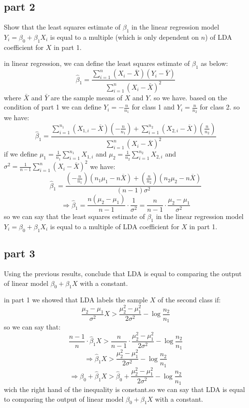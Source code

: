 \subsection{part 2}
Show that the least squares estimate of $\beta_1$ in the linear regression model $Y_i = \beta_0 + \beta_1 X_i$ is equal to a multiple (which is only dependent on $n$) of LDA coefficient for $X$ in part 1.

\begin{qsolve}
	\begin{qsolve}[]
		in linear regression, we can define the least squares estimate of $\beta_1$ as below:
		$$
		\hat{\beta}_1 = \frac{\sum_{i=1}^{n} (X_i - \bar{X})(Y_i - \bar{Y})}{\sum_{i=1}^{n} (X_i - \bar{X})^2}
		$$
		where $\bar{X}$ and $\bar{Y}$ are the sample means of $X$ and $Y$. so we have. based on the condition of part 1 we can define $Y_i = -\frac{n}{n_1}$ for class 1 and $Y_i = \frac{n}{n_2}$ for class 2. so we have:
		$$
		\hat{\beta}_1 = \frac{\sum_{i=1}^{n_1} (X_{1,i} - \overline{X}) \left(-\frac{n}{n_1}\right) + \sum_{i=1}^{n_2} (X_{2,i} - \overline{X}) \left(\frac{n}{n_2}\right)}{\sum_{i=1}^n (X_i - \overline{X})^2}
		$$
		if we define $\mu_1 = \frac{1}{n_1} \sum_{i=1}^{n_1} X_{1,i}$ and $\mu_2 = \frac{1}{n_2} \sum_{i=1}^{n_2} X_{2,i}$ and $\sigma^2 = \frac{1}{n-1} \sum_{i=1}^n (X_i - \overline{X})^2$ we have:
		$$
		\hat{\beta}_1 = \frac{\left(-\frac{n}{n_1}\right)(n_1\mu_1 - n\overline{X}) + \left(\frac{n}{n_2}\right)(n_2\mu_2 - n\overline{X})}{(n-1)\sigma^2}
		$$
		$$
		\Rightarrow \hat{\beta}_1 = \frac{n (\mu_2 - \mu_1)}{n-1} \cdot \frac{1}{\sigma^2} = \frac{n}{n-1} \cdot \frac{\mu_2 - \mu_1}{\sigma^2}
		$$
		so we can say that the least squares estimate of $\beta_1$ in the linear regression model $Y_i = \beta_0 + \beta_1 X_i$ is equal to a multiple of LDA coefficient for $X$ in part 1.
	\end{qsolve}
\end{qsolve}

\subsection{part 3}
Using the previous results, conclude that LDA is equal to comparing the output of linear model $\beta_0 + \beta_1 X$ with a constant.

\begin{qsolve}
	\begin{qsolve}[]
		in part 1 we showed that LDA labels the sample $X$ of the second class if:
		$$
		\frac{\mu_2 - \mu_1}{\sigma^2} X > \frac{\mu_2^2 - \mu_1^2}{2\sigma^2} - \log \frac{n_2}{n_1}
		$$
		so we can say that:
		$$
		\frac{n-1}{n} \cdot \hat{\beta}_1 X > \frac{n}{n-1} \cdot \frac{\mu_2^2 - \mu_1^2}{2\sigma^2} - \log \frac{n_2}{n_1}
		$$
		$$
		\Rightarrow \hat{\beta}_1 X > \frac{\mu_2^2 - \mu_1^2}{2\sigma^2} - \log \frac{n_2}{n_1}
		$$
		$$
		\Rightarrow \hat{\beta}_0 + \hat{\beta}_1 X > \hat{\beta}_0 + \frac{\mu_2^2 - \mu_1^2}{2\sigma^2} - \log \frac{n_2}{n_1}
		$$
		wich the right hand of the inequality is constant.so we can say that LDA is equal to comparing the output of linear model $\beta_0 + \beta_1 X$ with a constant.
	\end{qsolve}
\end{qsolve}
